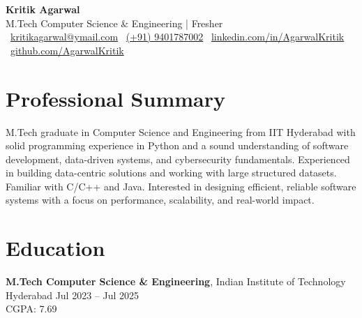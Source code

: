 \documentclass[a4paper,10pt]{article}
\begin{document}

\begin{center}
    {\Huge \textbf{Kritik Agarwal}}\\[1mm]
    {\small M.Tech Computer Science \& Engineering | Fresher}\\[1mm]
    {\small \faEnvelope~\href{mailto:kritikagarwal@ymail.com}{kritikagarwal@ymail.com} \quad \faPhone~\href{tel:+919401787002}{(+91) 9401787002} \quad\faLinkedinIn~\href{https://linkedin.com/in/AgarwalKritik}{linkedin.com/in/AgarwalKritik} \quad\faGithub~\href{https://github.com/AgarwalKritik}{github.com/AgarwalKritik}}\\[1mm]
\end{center}

\vspace{-5mm}
\section*{Professional Summary}
\vspace{-6pt}
M.Tech graduate in Computer Science and Engineering from IIT Hyderabad with solid programming experience in Python and a sound understanding of software development, data-driven systems, and cybersecurity fundamentals. Experienced in building data-centric solutions and working with large structured datasets. Familiar with C/C++ and Java. Interested in designing efficient, reliable software systems with a focus on performance, scalability, and real-world impact.
\vspace{-12pt}



\section*{Education}
\vspace{-6pt}
{\bf M.Tech Computer Science \& Engineering}, Indian Institute of Technology Hyderabad \hfill {Jul 2023 -- Jul 2025}\\
CGPA: 7.69
\end{document}
